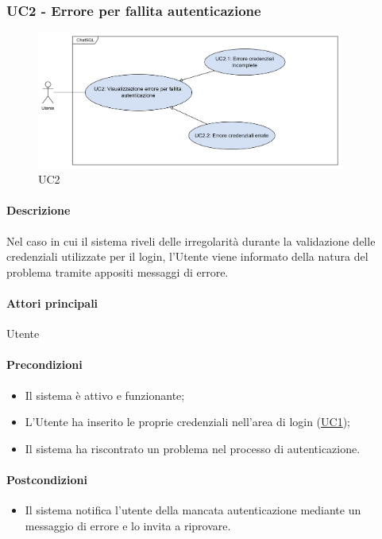 \subsubsection{UC2 - Errore per fallita autenticazione}\label{UC2}

\begin{figure}[H]
  \centering
  \includegraphics[width=0.90\textwidth]{assets/uc2.png}
  \caption{UC2}
\end{figure}

\paragraph*{Descrizione}
Nel caso in cui il sistema riveli delle irregolarità durante la validazione delle credenziali utilizzate per il login, l'Utente viene informato della natura del problema tramite appositi messaggi di errore.

\paragraph*{Attori principali}
Utente

\paragraph*{Precondizioni}
\begin{itemize}
  \item Il sistema è attivo e funzionante;
  \item L'Utente ha inserito le proprie credenziali nell'area di login (\hyperref[UC1]{UC1});
  \item Il sistema ha riscontrato un problema nel processo di autenticazione.  
\end{itemize}

\paragraph*{Postcondizioni}
\begin{itemize}
  \item Il sistema notifica l'utente della mancata autenticazione mediante un messaggio di errore e lo invita a riprovare.
\end{itemize}

